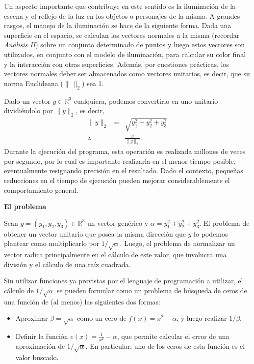 Un aspecto importante que contribuye en este sentido es la iluminaci\'on de la escena y el reflejo de la luz en los
objetos o personajes de la misma. A grandes rasgos, el manejo de la iluminaci\'on se hace de la siguiente forma. Dada
una superficie en el espacio, se calculan los vectores normales a la misma (recordar \emph{An\'alisis II}) sobre un
conjunto determinado de puntos y luego estos vectores son utilizados, en conjunto con el modelo de iluminaci\'on, para
calcular su color final y la interacci\'on con otras superficies. Adem\'as, por cuestiones pr\'acticas, los vectores
normales deber ser almacenados como vectores unitarios, es decir, que su norma Euclideana ($\|~\|_2$) sea 1.

Dado un vector $y \in \mathbb{R}^3$ cualquiera, podemos convertirlo en uno unitario dividi\'endolo por $\|y\|_2$, es
decir, 
\begin{eqnarray*}
\| y \|_2 & = & \sqrt{y_1^2 + y_2^2 + y_3^2}\\
z & = & \frac{y}{\|y\|_2}.
\end{eqnarray*}
\noindent Durante la ejecuci\'on del programa, esta operaci\'on es realizada millones de veces por segundo, por lo cual
es importante realizarla en el menor tiempo posible, eventualmente resignando precisi\'on en el
resultado. Dado el contexto, peque\~nas reducciones en el tiempo de ejecuci\'on pueden mejorar considerablemente el
comportamiento general.

\textbf{El problema}

Sean $y = (y_1, y_2, y_3) \in \mathbb{R}^3$ un vector gen\'erico y $\alpha = y_1^2 + y_2^2 + y_3^2$. El problema de
obtener un vector unitario que posea la misma direcci\'on que $y$ lo podemos plantear como multiplicarlo por
$1/\sqrt{\alpha}$. Luego, el problema de normalizar un vector radica principalmente en el c\'alculo de este valor, que
involucra una divisi\'on y el c\'alculo de una ra\'iz cuadrada. 

Sin utilizar funciones ya provistas por el lenguaje de programaci\'on a utilizar, el c\'alculo de $1/\sqrt{\alpha}$ se
pueden formular como un problema de b\'usqueda de ceros de una funci\'on de (al menos) las siguientes dos formas:
\begin{itemize}
\item Aproximar $\beta = \sqrt{\alpha}$ como un cero de $f(x) = x^2 - \alpha$, y luego realizar $1/\beta$. 
\item Definir la funci\'on $e(x) = \frac{1}{x^2} - \alpha$, que permite calcular el error de una aproximaci\'on de
$1/\sqrt{\alpha}$. En particular, uno de los ceros de esta funci\'on es el valor buscado.
\end{itemize}

